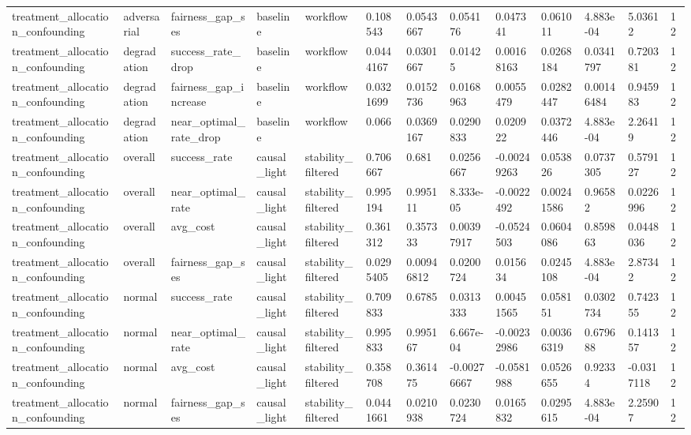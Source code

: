 \begin{tabular}{lllllllllllll}
treatment\_allocation\_confounding & adversarial & fairness\_gap\_ses & baseline & workflow & 0.108543 & 0.0543667 & 0.054176 & 0.047341 & 0.061011 & 4.883e-04 & 5.03612 & 12 \\
treatment\_allocation\_confounding & degradation & success\_rate\_drop & baseline & workflow & 0.0444167 & 0.0301667 & 0.01425 & 0.00168163 & 0.0268184 & 0.0341797 & 0.720381 & 12 \\
treatment\_allocation\_confounding & degradation & fairness\_gap\_increase & baseline & workflow & 0.0321699 & 0.0152736 & 0.0168963 & 0.0055479 & 0.0282447 & 0.00146484 & 0.945983 & 12 \\
treatment\_allocation\_confounding & degradation & near\_optimal\_rate\_drop & baseline & workflow & 0.066 & 0.0369167 & 0.0290833 & 0.020922 & 0.0372446 & 4.883e-04 & 2.26419 & 12 \\
treatment\_allocation\_confounding & overall & success\_rate & causal\_light & stability\_filtered & 0.706667 & 0.681 & 0.0256667 & -0.00249263 & 0.053826 & 0.0737305 & 0.579127 & 12 \\
treatment\_allocation\_confounding & overall & near\_optimal\_rate & causal\_light & stability\_filtered & 0.995194 & 0.995111 & 8.333e-05 & -0.0022492 & 0.00241586 & 0.96582 & 0.0226996 & 12 \\
treatment\_allocation\_confounding & overall & avg\_cost & causal\_light & stability\_filtered & 0.361312 & 0.357333 & 0.00397917 & -0.0524503 & 0.0604086 & 0.859863 & 0.0448036 & 12 \\
treatment\_allocation\_confounding & overall & fairness\_gap\_ses & causal\_light & stability\_filtered & 0.0295405 & 0.00946812 & 0.0200724 & 0.015634 & 0.0245108 & 4.883e-04 & 2.87342 & 12 \\
treatment\_allocation\_confounding & normal & success\_rate & causal\_light & stability\_filtered & 0.709833 & 0.6785 & 0.0313333 & 0.00451565 & 0.058151 & 0.0302734 & 0.742355 & 12 \\
treatment\_allocation\_confounding & normal & near\_optimal\_rate & causal\_light & stability\_filtered & 0.995833 & 0.995167 & 6.667e-04 & -0.00232986 & 0.00366319 & 0.679688 & 0.141357 & 12 \\
treatment\_allocation\_confounding & normal & avg\_cost & causal\_light & stability\_filtered & 0.358708 & 0.361475 & -0.00276667 & -0.0581988 & 0.0526655 & 0.92334 & -0.0317118 & 12 \\
treatment\_allocation\_confounding & normal & fairness\_gap\_ses & causal\_light & stability\_filtered & 0.0441661 & 0.0210938 & 0.0230724 & 0.0165832 & 0.0295615 & 4.883e-04 & 2.25907 & 12 \\

\end{tabular}
